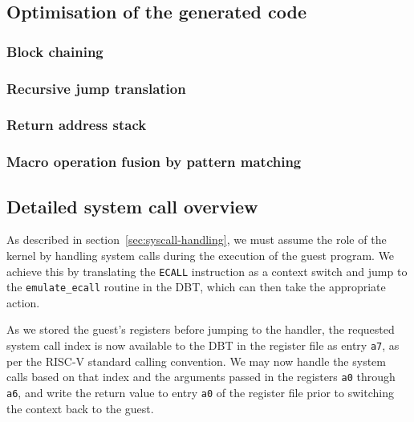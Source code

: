 \subsection{Optimisation of the generated code}
\label{sec:optimise}
\subsubsection{Block chaining}
\subsubsection{Recursive jump translation}
\subsubsection{Return address stack}
\subsubsection{Macro operation fusion by pattern matching}

\subsection{Detailed system call overview}

As described in section~\vref{sec:syscall-handling}, we must assume the role of the kernel by handling system calls during the execution of the guest program.
We achieve this by translating the \texttt{ECALL} instruction as a context switch and jump to the \texttt{emulate\_ecall} routine in the DBT, which can then take the appropriate action.

As we stored the guest's registers before jumping to the handler, the requested system call index is now available to the DBT in the register file as entry \texttt{a7}, as per the RISC-V standard calling convention.
We may now handle the system calls based on that index and the arguments passed in the registers \texttt{a0} through \texttt{a6}, and write the return value to entry \texttt{a0} of the register file prior to switching the context back to the guest.

